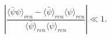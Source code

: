 \begin{equation}\label{eq:fluctuations}
  \left|\frac{\langle\bar{\psi}\psi\rangle_{ren}
    -\langle\bar{\psi}\rangle_{ren} \langle\psi\rangle_{ren}}
  {\langle\bar{\psi}\rangle_{ren} \langle\psi\rangle_{ren}}\right|
\ll 1.
\end{equation}

